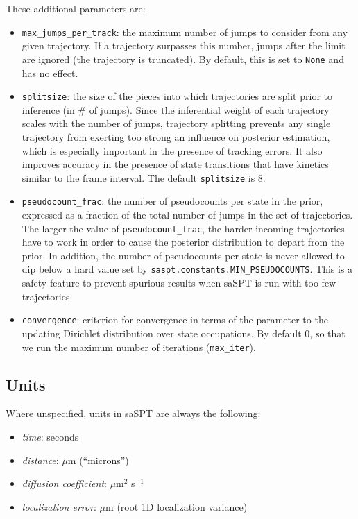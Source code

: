 \documentclass{article}
\begin{document}
These additional parameters are:
\begin{itemize}
    \item \verb|max_jumps_per_track|: the maximum number of jumps to consider from any given trajectory. If a trajectory surpasses this number, jumps after the limit are ignored (the trajectory is truncated). By default, this is set to \verb|None| and has no effect.
    \item \verb|splitsize|: the size of the pieces into which trajectories are split prior to inference (in \# of jumps). Since the inferential weight of each trajectory scales with the number of jumps, trajectory splitting prevents any single trajectory from exerting too strong an influence on posterior estimation, which is especially important in the presence of tracking errors. It also improves accuracy in the presence of state transitions that have kinetics similar to the frame interval. The default \verb|splitsize| is 8.
    \item \verb|pseudocount_frac|: the number of pseudocounts per state in the prior, expressed as a fraction of the total number of jumps in the set of trajectories. The larger the value of \verb|pseudocount_frac|, the harder incoming trajectories have to work in order to cause the posterior distribution to depart from the prior. In addition, the number of pseudocounts per state is never allowed to dip below a hard value set by \verb|saspt.constants.MIN_PSEUDOCOUNTS|. This is a safety feature to prevent spurious results when saSPT is run with too few trajectories.
    \item \verb|convergence|: criterion for convergence in terms of the parameter to the updating Dirichlet distribution over state occupations. By default 0, so that we run the maximum number of iterations (\verb|max_iter|).
\end{itemize}

\subsection{Units}

Where unspecified, units in saSPT are always the following:
\begin{itemize}
    \item \emph{time}: seconds
    \item \emph{distance}: $\mu$m (``microns'')
    \item \emph{diffusion coefficient}: $\mu$m$^{2}$ s$^{-1}$
    \item \emph{localization error}: $\mu$m (root 1D localization variance)
\end{itemize}
\end{document}
